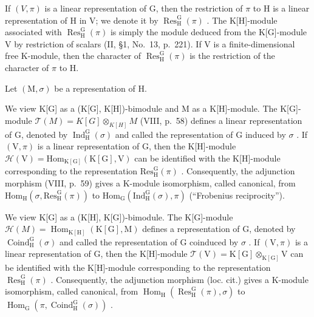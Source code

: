 If \((V,\pi)\) is a linear representation of G, then the restriction of \(\pi\) to H is a linear representation of H in V; we denote it by \(\operatorname{Res}_{\mathrm{H}}^{\mathrm{G}}(\pi)\) . The K{[}H{]}-module associated with \(\operatorname{Res}_{\mathrm{H}}^{\mathrm{G}}(\pi)\) is simply the module deduced from the K{[}G{]}-module V by restriction of scalars (II, §1, No.~13, p.~221). If V is a finite-dimensional free K-module, then the character of \(\operatorname{Res}_{\mathrm{H}}^{\mathrm{G}}(\pi)\) is the restriction of the character of \(\pi\) to H.

Let \((\mathrm{M},\sigma)\) be a representation of H.

We view K{[}G{]} as a (K{[}G{]}, K{[}H{]})-bimodule and M as a K{[}H{]}-module. The K{[}G{]}-module \(\mathcal{T}(M) = K[G] \otimes_{K[H]} M\) (VIII, p.~58) defines a linear representation of G, denoted by \(\operatorname{Ind}_{\mathrm{H}}^{\mathrm{G}}(\sigma)\) and called the representation of G induced by \(\sigma\) . If \((\mathrm{V}, \pi)\) is a linear representation of G, then the K{[}H{]}-module \(\mathcal{H}(\mathrm{V}) = \mathrm{Hom}_{\mathrm{K[G]}}(\mathrm{K[G]},\mathrm{V})\) can be identified with the K{[}H{]}-module corresponding to the representation \(\mathrm{Res}_{\mathrm{H}}^{\mathrm{G}}(\pi)\) . Consequently, the adjunction morphism (VIII, p.~59) gives a K-module isomorphism, called canonical, from \(\mathrm{Hom}_{\mathrm{H}}(\sigma ,\mathrm{Res}_{\mathrm{H}}^{\mathrm{G}}(\pi))\) to \(\mathrm{Hom}_{\mathrm{G}}(\mathrm{Ind}_{\mathrm{H}}^{\mathrm{G}}(\sigma),\pi)\) (``Frobenius reciprocity'').

We view K{[}G{]} as a (K{[}H{]}, K{[}G{]})-bimodule. The K{[}G{]}-module \(\mathcal{H}(M) = \operatorname{Hom}_{\mathrm{K}[\mathrm{H}]}(\mathrm{K}[\mathrm{G}], \mathrm{M})\) defines a representation of G, denoted by \(\operatorname{Coind}_{\mathrm{H}}^{\mathrm{G}}(\sigma)\) and called the representation of G coinduced by \(\sigma\) . If \((\mathrm{V}, \pi)\) is a linear representation of G, then the K{[}H{]}-module \(\mathcal{T}(\mathrm{V}) = \mathrm{K}[\mathrm{G}] \otimes_{\mathrm{K}[\mathrm{G}]} \mathrm{V}\) can be identified with the K{[}H{]}-module corresponding to the representation \(\operatorname{Res}_{\mathrm{H}}^{\mathrm{G}}(\pi)\) . Consequently, the adjunction morphism (loc. cit.) gives a K-module isomorphism, called canonical, from \(\operatorname{Hom}_{\mathrm{H}}(\operatorname{Res}_{\mathrm{H}}^{\mathrm{G}}(\pi), \sigma)\) to \(\operatorname{Hom}_{\mathrm{G}}(\pi, \operatorname{Coind}_{\mathrm{H}}^{\mathrm{G}}(\sigma))\) .

